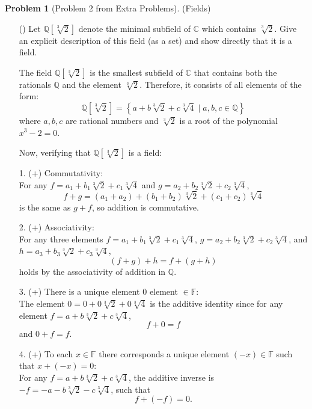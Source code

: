 \documentclass[12pt]{article}
\theoremstyle{definition}
\newtheorem{problem}{Problem}
\newcounter{subq}[problem]
\newenvironment{subproblem}
{\refstepcounter{subq} \begin{itemize} \item[(\alph{subq})]}
{\end{itemize} \medskip}
\begin{document}
\begin{problem}[Problem 2 from Extra Problems]
    (Fields)
    \begin{subproblem}
        Let $\mathbb{Q}[\sqrt[3]{2}]$ denote the minimal subfield of $\mathbb{C}$ which contains $\sqrt[3]{2}$. Give an explicit description of this field (as a set) and show directly that it is a field.
        \begin{solution}

            The field \( \mathbb{Q}[\sqrt[3]{2}] \) is the smallest subfield of \( \mathbb{C} \) that contains both the rationals \( \mathbb{Q} \) and the element \( \sqrt[3]{2} \). Therefore, it consists of all elements of the form:
            \[
            \mathbb{Q}[\sqrt[3]{2}] = \left\{ a + b \sqrt[3]{2} + c \sqrt[3]{4} \mid a, b, c \in \mathbb{Q} \right\}
            \]
            where \( a, b, c \) are rational numbers and \( \sqrt[3]{2} \) is a root of the polynomial \( x^3 - 2 = 0 \).

            Now, verifying that \( \mathbb{Q}[\sqrt[3]{2}] \) is a field:

            1. (+) Commutativity:\\
            For any \( f = a_1 + b_1 \sqrt[3]{2} + c_1 \sqrt[3]{4} \) and \( g = a_2 + b_2 \sqrt[3]{2} + c_2 \sqrt[3]{4} \), 
            \[
            f + g = (a_1 + a_2) + (b_1 + b_2) \sqrt[3]{2} + (c_1 + c_2) \sqrt[3]{4}
            \]
            is the same as \( g + f \), so addition is commutative.

            2. (+) Associativity:\\
            For any three elements \( f = a_1 + b_1 \sqrt[3]{2} + c_1 \sqrt[3]{4} \), \( g = a_2 + b_2 \sqrt[3]{2} + c_2 \sqrt[3]{4} \), and \( h = a_3 + b_3 \sqrt[3]{2} + c_3 \sqrt[3]{4} \), 
            \[
            (f + g) + h = f + (g + h)
            \]
            holds by the associativity of addition in \( \mathbb{Q} \).

            3. (+) There is a unique element $0$ element $\in \mathbb{F}$:\\
            The element \( 0 = 0 + 0 \sqrt[3]{2} + 0 \sqrt[3]{4} \) is the additive identity since for any element \( f = a + b \sqrt[3]{2} + c \sqrt[3]{4} \),
            \[
            f + 0 = f
            \]
            and \( 0 + f = f \).

            4. (+) To each $x \in \mathbb{F}$ there corresponds a unique element $(-x) \in \mathbb{F}$ such that $x + (-x) = 0$:\\
            For any \( f = a + b \sqrt[3]{2} + c \sqrt[3]{4} \), the additive inverse is \( -f = -a - b \sqrt[3]{2} - c \sqrt[3]{4} \), such that 
            \[
            f + (-f) = 0.
            \]


\end{solution}
\end{subproblem}
\end{problem}
\end{document}

